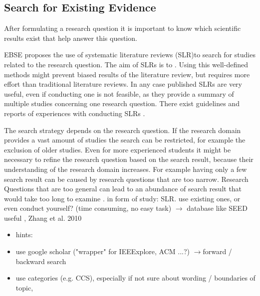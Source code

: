 \subsection{Search for Existing Evidence}
\label{subsec:search for existing evidence} 

After formulating a research question it is important to know which scientific results exist that help answer this question.

EBSE proposes the use of systematic literature reviews (SLR)to search for studies related to the research question. The aim of SLRs is to . Using this well-defined methods might prevent biased results of the literature review, but requires more effort than traditional literature reviews.
In any case published SLRs are very useful, even if conducting one is not feasible, as they provide a summary of multiple studies concerning one research question. There exist guidelines  and reports of experiences with conducting SLRs .

The search strategy depends on the research question. If the research domain provides a vast amount of studies the search can  be restricted, for example the exclusion of older studies. 
Even for more experienced students it might be necessary to refine the research question based on the search result, because their understanding of the research domain increases. For example having only a few search result can be caused by research questions that are too narrow. Research Questions that are too general can lead to an abundance of search result that would take too long to examine . 
\newline
\newline
in form of study: SLR. use existing ones, or even conduct yourself? (time consuming, no easy task)
\newline
$\rightarrow$ database like SEED useful
\newline
{}, Zhang et al. 2010
\begin{itemize} 
	\item hints:
	\item use google scholar ("wrapper" for IEEExplore, ACM ...?) $\rightarrow$forward / backward search
	\item use categories (e.g. CCS), especially if not sure about wording / boundaries of topic, 
\end{itemize}